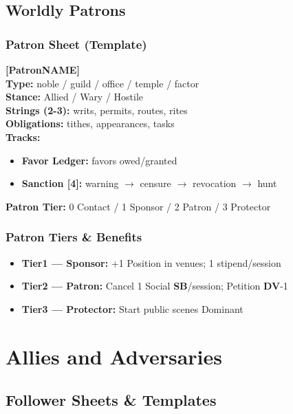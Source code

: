 \documentclass[10pt]{article}
\newcommand{\patron}{\textbf{Patron}}
\newcommand{\sbtext}{\textbf{SB}}
\newcommand{\dv}{\textbf{DV}}
\newcommand{\timer}[1]{\textbf{[#1]}}
\newcommand{\tier}{\textbf{Tier}}
\begin{document}
\subsection{Worldly Patrons}
\subsubsection{Patron Sheet (Template)}
\textbf{[\patron NAME]} \\
\textbf{Type:} noble / guild / office / temple / factor \\
\textbf{Stance:} Allied / Wary / Hostile \\
\textbf{Strings (2-3):} writs, permits, routes, rites \\
\textbf{Obligations:} tithes, appearances, tasks \\
\textbf{Tracks:}
\begin{itemize}[noitemsep]
\item \textbf{Favor Ledger:} favors owed/granted
\item \textbf{Sanction \timer{4}:} warning $\rightarrow$ censure $\rightarrow$ revocation $\rightarrow$ hunt
\end{itemize}
\textbf{Patron \tier:} 0 Contact / 1 Sponsor / 2 Patron / 3 Protector

\subsubsection{Patron Tiers \& Benefits}
\begin{itemize}[noitemsep]
\item \textbf{\tier 1 --- Sponsor:} +1 Position in venues; 1 stipend/session
\item \textbf{\tier 2 --- Patron:} Cancel 1 Social \sbtext/session; Petition \dv -1
\item \textbf{\tier 3 --- Protector:} Start public scenes Dominant
\end{itemize}

\section{Allies and Adversaries}

\subsection{Follower Sheets \& Templates}
\end{document}
